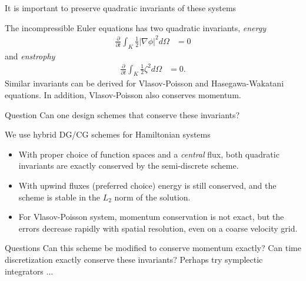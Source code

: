 \documentclass[pdf]{beamer}
\newcommand{\pfraca}[1]{\frac{\partial}{\partial #1}}
\newcommand{\mypause}{}
\theoremstyle{definition}
\begin{document}
\begin{frame}{It is important to preserve quadratic invariants of
    these systems}%

  The incompressible Euler equations has two quadratic invariants,
  \emph{energy}
  \begin{align*}
    \pfraca{t}\int_K \frac{1}{2} |\nabla\phi|^2  d\Omega &= 0
  \end{align*}
  and \emph{enstrophy}
  \begin{align*}
    \pfraca{t}\int_K \frac{1}{2}\zeta^2 d\Omega &= 0.
  \end{align*}
  Similar invariants can be derived for Vlasov-Poisson and
  Hasegawa-Wakatani equations.  In addition, Vlasov-Poisson also
  conserves momentum.
  \mypause
  \begin{block}{Question}
    Can one design schemes that conserve these invariants?
  \end{block}

\end{frame}

\begin{frame}{We use hybrid DG/CG schemes for Hamiltonian systems}

  \begin{itemize}
  \item With proper choice of function spaces and a \emph{central}
    flux, both quadratic invariants are exactly conserved by the
    semi-discrete scheme.
  \item With upwind fluxes (preferred choice) energy is still
    conserved, and the scheme is stable in the $L_2$ norm of the
    solution.
  \item For Vlasov-Poisson system, momentum conservation is not exact,
    but the errors decrease rapidly with spatial resolution, even on a
    coarse velocity grid.
  \end{itemize}
  \mypause
  \begin{block}{Questions}
    Can this scheme be modified to conserve momentum exactly? Can time
    discretization exactly conserve these invariants?  Perhaps try
    symplectic integrators ...
  \end{block}

\end{frame}
\end{document}
